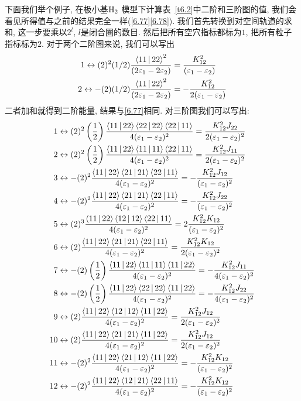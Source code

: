 下面我们举个例子, 
在极小基$\mathrm{H}_2$ 模型下计算表~\autoref{t6.2}中二阶和三阶图的值, 
我们会看见所得值与之前的结果完全一样(\autoref{6.77}\autoref{6.78}). 
我们首先转换到对空间轨道的求和, 
这一步要乘以$2^l$, 
$l$是闭合圈的数目. 
然后把所有空穴指标都标为$1$, 
把所有粒子指标标为$2$. 
对于两个二阶图来说, 
我们可以写出
\begin{align*}
1\leftrightarrow (2)^2(1/2)\frac{\Braket{11|22}^2}{(2\varepsilon_1-2\varepsilon_2)} & = \frac{K_{12}^2}{(\varepsilon_1-\varepsilon_2)}\\
2\leftrightarrow -(2)(1/2)\frac{\Braket{11|22}^2}{(2\varepsilon_1-2\varepsilon_2)} & = -\frac{K_{12}^2}{2(\varepsilon_1-\varepsilon_2)}
\end{align*}
二者加和就得到二阶能量, 
结果与\autoref{6.77}相同. 
对三阶图我们可以写出:
\begin{align*}
1&\leftrightarrow (2)^2\left( \frac{1}{2} \right) \frac{\Braket{11|22}\Braket{22|22}\Braket{22|11}}{4(\varepsilon_1 - \varepsilon_2)^2}  = \frac{K_{12}^2J_{22}}{2(\varepsilon_1 - \varepsilon_2)^2}\\
2&\leftrightarrow (2)^2\left( \frac{1}{2} \right) \frac{\Braket{11|22}\Braket{11|11}\Braket{22|11}}{4(\varepsilon_1 - \varepsilon_2)^2}  = \frac{K_{12}^2J_{11}}{2(\varepsilon_1 - \varepsilon_2)^2}\\
3&\leftrightarrow -(2)^2 \frac{\Braket{11|22}\Braket{21|21}\Braket{22|11}}{4(\varepsilon_1 - \varepsilon_2)^2}  = -\frac{K_{12}^2J_{12}}{(\varepsilon_1 - \varepsilon_2)^2}\\
4&\leftrightarrow -(2)^2 \frac{\Braket{11|22}\Braket{21|21}\Braket{22|11}}{4(\varepsilon_1 - \varepsilon_2)^2}  = -\frac{K_{12}^2J_{22}}{(\varepsilon_1 - \varepsilon_2)^2}\\
5&\leftrightarrow (2)^3 \frac{\Braket{11|22}\Braket{12|12}\Braket{22|11}}{4(\varepsilon_1 - \varepsilon_2)^2}  = 2\frac{K_{12}^2K_{12}}{(\varepsilon_1 - \varepsilon_2)^2}\\
6&\leftrightarrow (2) \frac{\Braket{11|22}\Braket{21|21}\Braket{22|11}}{4(\varepsilon_1 - \varepsilon_2)^2}  = \frac{K_{12}^2K_{12}}{2(\varepsilon_1 - \varepsilon_2)^2}\\
7&\leftrightarrow -(2)\left( \frac{1}{2} \right) \frac{\Braket{11|22}\Braket{11|11}\Braket{11|22}}{4(\varepsilon_1 - \varepsilon_2)^2}  = -\frac{K_{12}^2J_{11}}{4(\varepsilon_1 - \varepsilon_2)^2}\\
8&\leftrightarrow -(2)\left( \frac{1}{2} \right) \frac{\Braket{11|22}\Braket{22|22}\Braket{11|22}}{4(\varepsilon_1 - \varepsilon_2)^2}  = -\frac{K_{12}^2J_{22}}{4(\varepsilon_1 - \varepsilon_2)^2}\\
9&\leftrightarrow (2) \frac{\Braket{11|22}\Braket{12|12}\Braket{11|22}}{4(\varepsilon_1 - \varepsilon_2)^2}  = \frac{K_{12}^2J_{12}}{2(\varepsilon_1 - \varepsilon_2)^2}\\
10&\leftrightarrow (2) \frac{\Braket{11|22}\Braket{21|21}\Braket{11|22}}{4(\varepsilon_1 - \varepsilon_2)^2}  = \frac{K_{12}^2J_{12}}{2(\varepsilon_1 - \varepsilon_2)^2}\\
11&\leftrightarrow -(2)^2 \frac{\Braket{11|22}\Braket{21|12}\Braket{11|22}}{4(\varepsilon_1 - \varepsilon_2)^2}  = -\frac{K_{12}^2K_{12}}{(\varepsilon_1 - \varepsilon_2)^2}\\
12&\leftrightarrow -(2)^2 \frac{\Braket{11|22}\Braket{12|21}\Braket{22|11}}{4(\varepsilon_1 - \varepsilon_2)^2}  = -\frac{K_{12}^2K_{12}}{(\varepsilon_1 - \varepsilon_2)^2}
\end{align*}
